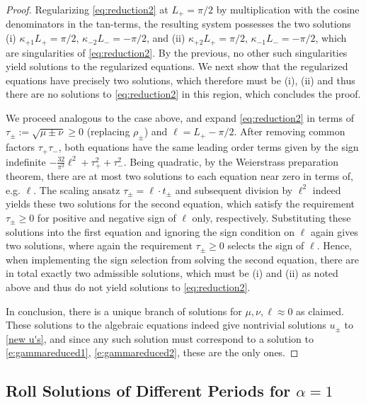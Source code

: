 \documentclass{article}
\numberwithin{equation}{section}
\begin{document}
\begin{proof}
		 	Regularizing \eqref{eq:reduction2} at $L_+=\pi/2$ by multiplication with the cosine denominators in the tan-terms, the resulting system possesses the two solutions (i) $\kappa_{+1}L_+=\pi/2$, $\kappa_{-2}L_-=-\pi/2$, and (ii) $\kappa_{+2}L_+=\pi/2$, $\kappa_{-1}L_-=-\pi/2$, which are singularities of \eqref{eq:reduction2}.  By the previous, no other such singularities yield solutions to the regularized equations. We next show that the regularized equations have precisely two solutions, which therefore must be (i), (ii) and thus there are no solutions to \eqref{eq:reduction2} in this region, which concludes the proof.
		 	
		 	We proceed analogous to the case above, and expand \eqref{eq:reduction2} in terms of $\tau_\pm:=\sqrt{\mu\pm\nu}\geq 0$ (replacing $\rho_\pm$) and $\ell=L_+-\pi/2$. After removing common factors $\tau_+\tau_-$, both equations have the same leading order terms given by the sign indefinite $-\frac{32}{\pi^2}\ell^2 + \tau_+^2 + \tau_-^2$. Being quadratic, by the Weierstrass preparation theorem, there are at most two solutions to each equation near zero in terms of, e.g. $\ell$. The scaling ansatz $\tau_\pm = \ell\cdot  t_\pm$ and subsequent division by $\ell^2$ indeed yields these two solutions for the second equation, which satisfy the requirement $\tau_\pm\geq0$ for positive and negative sign of $\ell$ only, respectively. Substituting these solutions into the first equation and ignoring the sign condition on $\ell$ again gives two solutions, where again the requirement $\tau_\pm\geq0$ selects the sign of $\ell$. Hence, when implementing the sign selection from solving the second equation, there are in total exactly two admissible solutions, which must be (i) and (ii) as noted above and thus do not yield solutions to \eqref{eq:reduction2}. 
		 	
		 	\medskip
		 	In conclusion, there is a unique branch of solutions for $\mu,\nu,\ell\approx 0$ as claimed. These solutions to the algebraic equations indeed give nontrivial solutions $u_\pm$ to \eqref{new u's}, and since any such solution must correspond to a solution to \eqref{e:gammareduced1}, \eqref{e:gammareduced2}, these are the only ones.  
		 \end{proof}


\subsection{Roll Solutions of Different Periods for $\alpha =1$} \label{subsec: different periods}
			
\end{document}
